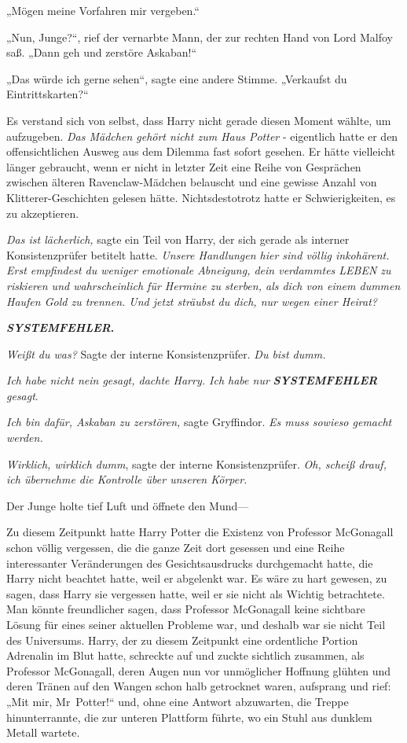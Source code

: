 {„Mögen meine Vorfahren mir vergeben.“

„Nun, Junge?“, rief der vernarbte Mann, der zur rechten Hand von Lord Malfoy saß. „Dann geh und zerstöre Askaban!“

„Das würde ich gerne sehen“, sagte eine andere Stimme. „Verkaufst du Eintrittskarten?“

Es verstand sich von selbst, dass Harry nicht gerade diesen Moment wählte, um aufzugeben. \emph{Das Mädchen gehört nicht zum Haus Potter} - eigentlich hatte er den offensichtlichen Ausweg aus dem Dilemma fast sofort gesehen. Er hätte vielleicht länger gebraucht, wenn er nicht in letzter Zeit eine Reihe von Gesprächen zwischen älteren Ravenclaw-Mädchen belauscht und eine gewisse Anzahl von Klitterer-Geschichten gelesen hätte. Nichtsdestotrotz hatte er Schwierigkeiten, es zu akzeptieren.

\emph{Das ist lächerlich,} sagte ein Teil von Harry, der sich gerade als interner Konsistenzprüfer betitelt hatte. \emph{Unsere Handlungen hier sind völlig inkohärent. Erst empfindest du weniger emotionale Abneigung, dein verdammtes LEBEN zu riskieren und wahrscheinlich für Hermine zu sterben, als dich von einem dummen Haufen Gold zu trennen. Und jetzt sträubst du dich, nur wegen einer Heirat?}

\textbf{\emph{SYSTEMFEHLER}.}

\emph{Weißt du was?} Sagte der interne Konsistenzprüfer. \emph{Du bist dumm.}

\emph{Ich habe nicht nein gesagt, dachte Harry. Ich habe nur} \textbf{\emph{SYSTEMFEHLER}} \emph{gesagt}.

\emph{Ich bin dafür, Askaban zu zerstören,} sagte Gryffindor. \emph{Es muss sowieso gemacht werden.}

\emph{Wirklich, wirklich dumm}, sagte der interne Konsistenzprüfer. \emph{Oh, scheiß drauf, ich übernehme die Kontrolle über unseren Körper.}

Der Junge holte tief Luft und öffnete den Mund—

Zu diesem Zeitpunkt hatte Harry Potter die Existenz von Professor McGonagall schon völlig vergessen, die die ganze Zeit dort gesessen und eine Reihe interessanter Veränderungen des Gesichtsausdrucks durchgemacht hatte, die Harry nicht beachtet hatte, weil er abgelenkt war. Es wäre zu hart gewesen, zu sagen, dass Harry sie vergessen hatte, weil er sie nicht als Wichtig betrachtete. Man könnte freundlicher sagen, dass Professor McGonagall keine sichtbare Lösung für eines seiner aktuellen Probleme war, und deshalb war sie nicht Teil des Universums. Harry, der zu diesem Zeitpunkt eine ordentliche Portion Adrenalin im Blut hatte, schreckte auf und zuckte sichtlich zusammen, als Professor McGonagall, deren Augen nun vor unmöglicher Hoffnung glühten und deren Tränen auf den Wangen schon halb getrocknet waren, aufsprang und rief: „Mit mir, Mr~Potter!“ und, ohne eine Antwort abzuwarten, die Treppe hinunterrannte, die zur unteren Plattform führte, wo ein Stuhl aus dunklem Metall wartete.

}
